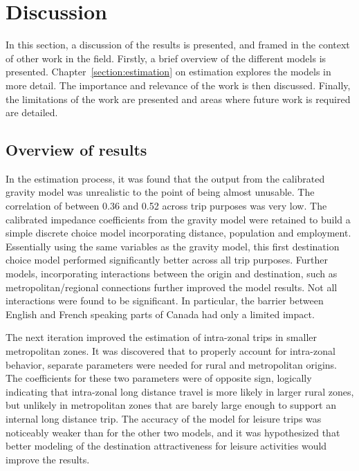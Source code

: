 \chapter{Discussion}
In this section, a discussion of the results is presented, and framed in the context of other work in the field. Firstly, a brief overview of the different models is presented. Chapter~\ref{section:estimation} on estimation explores the models in more detail. The importance and relevance of the work is then discussed. Finally, the limitations of the work are presented and areas where future work is required are detailed.

\section{Overview of results}
In the estimation process, it was found that the output from the calibrated gravity model  was unrealistic to the point of being almost unusable. The correlation of between 0.36 and 0.52 across trip purposes was very low. The calibrated impedance coefficients from the gravity model were retained to build a simple discrete choice model incorporating distance, population and employment. Essentially using the same variables as the gravity model, this first destination choice model performed significantly better across all trip purposes. Further models, incorporating interactions between the origin and destination, such as metropolitan/regional connections further improved the model results. Not all interactions were found to be significant. In particular, the barrier between English and French speaking parts of Canada had only a limited impact. 

The next iteration improved the estimation of intra-zonal trips in smaller metropolitan zones. It was discovered that to properly account for intra-zonal behavior, separate parameters were needed for rural and metropolitan origins. The coefficients for these two parameters were of opposite sign, logically indicating that intra-zonal long distance travel is more likely in larger rural zones, but unlikely in metropolitan zones that are barely large enough to support an internal long distance trip. The accuracy of the model for leisure trips was noticeably weaker than for the other two models, and it was hypothesized that better modeling of the destination attractiveness for leisure activities would improve the results.

